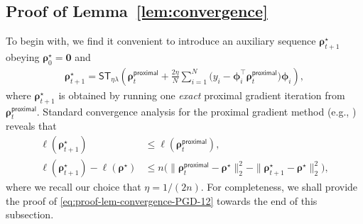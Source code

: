 \documentclass[english]{article}
\begin{document}



\subsection{Proof of Lemma~\ref{lem:convergence}}
\label{subsec:proof-lem-convergence}

To begin with, we find it convenient to introduce an auxiliary sequence  ${\bm \rho}_{t+1}^{\star}$ obeying ${\bm \rho}_0^{\star} = {\bm 0}$ and 
%
\begin{align*}
{\bm \rho}_{t+1}^{\star} = \mathsf{ST}_{\eta\lambda}\left({\bm \rho}_t^{\mathsf{proximal}} + \frac{2\eta}{N}\sum_{i=1}^N\big(y_i-{\bm \phi}_i^{\top}{\bm \rho}_t^{\mathsf{proximal}}\big){\bm \phi}_i\right),
\end{align*}
%
where $\bm{\rho}_{t+1}^{\star}$ is obtained by running one {\em exact} proximal gradient iteration from $\bm{\rho}_t^{\mathsf{proximal}}$. 
Standard convergence analysis for the proximal gradient method (e.g., \citet{beck2017first}) reveals that
%
\begin{subequations}
\label{eq:proof-lem-convergence-PGD-12}
\begin{align}
\ell({\bm \rho}_{t+1}^{\star}) &\le \ell({\bm \rho}_{t}^{\mathsf{proximal}}),\label{eq:proof-lem-convergence-PGD-1}\\
\ell({\bm \rho}_{t+1}^{\star}) - \ell({\bm \rho}^{\star}) &\le n\big(\|{\bm \rho}_t^{\mathsf{proximal}} - {\bm \rho}^{\star}\|_2^2 - \|{\bm \rho}_{t+1}^{\star} - {\bm \rho}^{\star}\|_2^2\big),\label{eq:proof-lem-convergence-PGD-2}
\end{align}
\end{subequations}
%
where we recall our choice that $\eta = 1/(2n)$. 
For completeness, we shall provide the proof of \eqref{eq:proof-lem-convergence-PGD-12} towards the end of this subsection.
\end{document}
